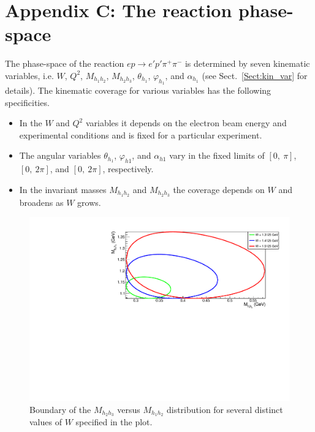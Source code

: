 
\renewcommand{\thesection}{C}
    \makeatletter
   \renewcommand{\theequation}{\thesection.\@arabic\c@equation}
    \makeatother
\section*{Appendix C: The reaction phase-space}
\label{app_ph_space}



The phase-space of the reaction $ep \rightarrow e'p'\pi^{+}\pi^{-}$ is determined by seven kinematic variables, i.e. $W$, $Q^{2}$, $M_{h_{1}h_{2}}$, $M_{h_{2}h_{3}}$, $\theta_{h_{1}}$, $\varphi_{h_{1}}$, and $\alpha_{h_{1}}$ (see Sect.~\ref{Sect:kin_var} for details). The kinematic coverage for various variables has the following specificities.\vspace{-0.2em} 
\begin{itemize}
\item In the $W$ and $Q^{2}$ variables it depends on the electron beam energy and experimental conditions and is fixed for a particular experiment. \vspace{-0.3em}
\item The angular variables $\theta_{h_{1}}$, $\varphi_{h1}$, and $\alpha_{h1}$ vary in the fixed limits of $[0,~\pi]$, $[0,~2\pi]$, and $[0,~2\pi]$, respectively.\vspace{-0.3em}
\item In the invariant masses $M_{h_{1}h_{2}}$ and $M_{h_{2}h_{3}}$ the coverage depends on $W$ and broadens as $W$ grows.\vspace{-0.2em}
\end{itemize}
\vspace{-1em}
\begin{figure}[htp]
\begin{center}
\includegraphics[width=13cm]{pictures/appendix/dalitz_plots_boundaries.pdf}
\caption{\small Boundary of the $M_{h_{2}h_{3}}$ versus $M_{h_{1}h_{2}}$ distribution for several distinct values of $W$ specified in the plot.} \label{fig:dalitz}
\end{center}
\end{figure}

